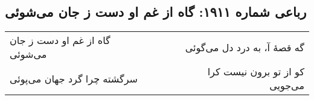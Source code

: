 \begin{center}
\section*{رباعی شماره ۱۹۱۱: گاه از غم او دست ز جان می‌شوئی}
\label{sec:1911}
\begin{longtable}{l p{0.5cm} r}
گاه از غم او دست ز جان می‌شوئی
&&
گه قصهٔ آ، به درد دل می‌گوئی
\\
سرگشته چرا گرد جهان می‌پوئی
&&
کو از تو برون نیست کرا می‌جویی
\\
\end{longtable}
\end{center}
